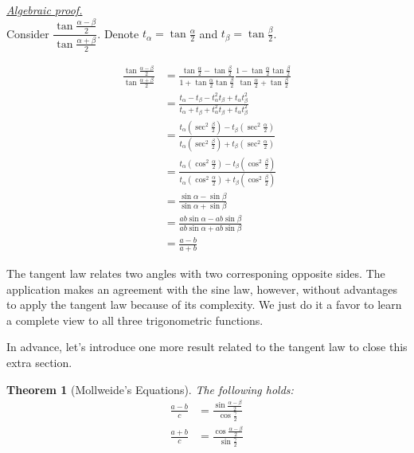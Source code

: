 \documentclass[12pt]{article}
\newtheorem*{theorem}{Theorem}
\renewenvironment{proof}[1][Proof]{\begin{snugshade*} \underline{\textit{{#1}.}}\\}{\hfill \qedsymbol \end{snugshade*}}
\begin{document}
    \begin{proof}[Algebraic proof]
        Consider $\dfrac{\tan{\frac{\alpha-\beta}{2}}}{\tan{\frac{\alpha+\beta}{2}}}$. Denote $t_\alpha = \tan{\frac{\alpha}{2}}$ and $t_\beta = \tan{\frac{\beta}{2}}$.

        \begin{align*}
            \frac{\tan{\frac{\alpha-\beta}{2}}}{\tan{\frac{\alpha+\beta}{2}}}&=\frac{\tan{\frac{\alpha}{2}}-\tan{\frac{\beta}{2}}}{1+\tan{\frac{\alpha}{2}}\tan{\frac{\beta}{2}}}\frac{1-\tan{\frac{\alpha}{2}}\tan{\frac{\beta}{2}}}{\tan{\frac{\alpha}{2}}+\tan{\frac{\beta}{2}}}\\
            &=\frac{t_\alpha - t_\beta - t_\alpha^2t_\beta+t_\alpha t_\beta^2}{t_\alpha + t_\beta + t_\alpha^2t_\beta+t_\alpha t_\beta^2}\\
            &=\frac{t_\alpha(\sec^2{\frac{\beta}{2}})-t_\beta(\sec^2{\frac{\alpha}{2}})}{t_\alpha(\sec^2{\frac{\beta}{2}})+t_\beta(\sec^2{\frac{\alpha}{2}})}\\
            &=\frac{t_\alpha(\cos^2{\frac{\alpha}{2}})-t_\beta(\cos^2{\frac{\beta}{2}})}{t_\alpha(\cos^2{\frac{\alpha}{2}})+t_\beta(\cos^2{\frac{\beta}{2}})}\\
            &=\frac{\sin{\alpha}-\sin{\beta}}{\sin{\alpha}+\sin{\beta}}\\
            &=\frac{ab\sin{\alpha}-ab\sin{\beta}}{ab\sin{\alpha}+ab\sin{\beta}}\\
            &=\frac{a-b}{a+b}
        \end{align*}
    \end{proof}

    The tangent law relates two angles with two corresponing opposite sides. The application makes an agreement with the sine law, however, without advantages to apply the tangent law because of its complexity. We just do it a favor to learn a complete view to all three trigonometric functions.

    In advance, let's introduce one more result related to the tangent law to close this extra section.

    \begin{theorem}[Mollweide's Equations]
        The following holds:\begin{align}
            \frac{a-b}{c}&=\frac{\sin{\frac{\alpha-\beta}{2}}}{\cos{\frac{\gamma}{2}}}\\
            \frac{a+b}{c}&=\frac{\cos{\frac{\alpha-\beta}{2}}}{\sin{\frac{\gamma}{2}}}
        \end{align}
    \end{theorem}
\end{document}
